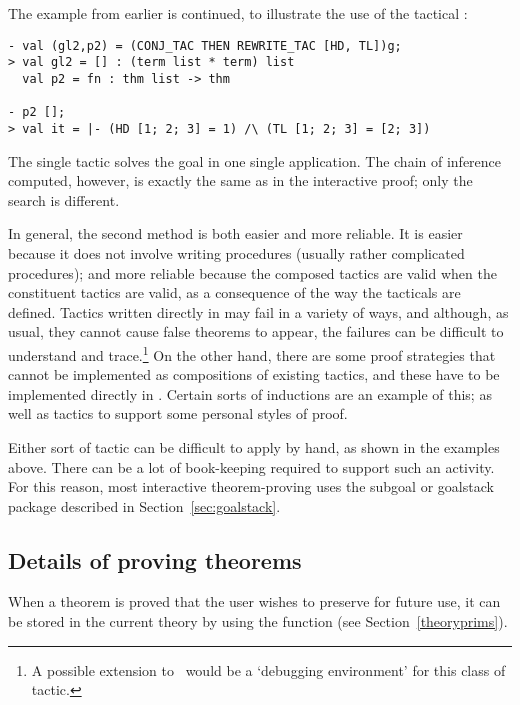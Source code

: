 The example from earlier
is continued, to illustrate the use of the tactical :

\begin{session}\begin{verbatim}
- val (gl2,p2) = (CONJ_TAC THEN REWRITE_TAC [HD, TL])g;
> val gl2 = [] : (term list * term) list
  val p2 = fn : thm list -> thm

- p2 [];
> val it = |- (HD [1; 2; 3] = 1) /\ (TL [1; 2; 3] = [2; 3])
\end{verbatim}\end{session}

\noindent The single tactic 
solves the goal in one single application. The chain of inference computed,
however, is exactly the same as in the interactive proof; only the search is
different.

In general, the second method is both easier and more reliable.  It is
easier because it does not involve writing \ML{} procedures (usually
rather complicated procedures); and more reliable because
the composed tactics are valid
 when the constituent tactics are valid,
as a consequence of the way the tacticals are defined. Tactics written
directly in \ML{} may fail
in a variety of ways, and although, as usual, they cannot cause false
theorems to appear, the failures can be difficult to understand and
trace.\footnote{A possible extension to \HOL\ would be a `debugging
  environment' for this class of tactic.} On the other hand, there are
some proof strategies that cannot be implemented as compositions of
existing tactics, and these have to be implemented directly in \ML.
Certain sorts of inductions are an example of this; as well as tactics
to support some personal styles of proof.

Either sort of tactic can be difficult to apply by hand, as shown in
the examples above.  There can be a lot of book-keeping required to
support such an activity.  For this reason, most interactive
theorem-proving uses the subgoal or goalstack package described in
Section~\ref{sec:goalstack}.


\subsection{Details of proving theorems}
\label{using-tactics}

When a theorem is proved that the user wishes to preserve for future use,
it can be stored in the current theory
by using the function  (see Section~\ref{theoryprims}).

